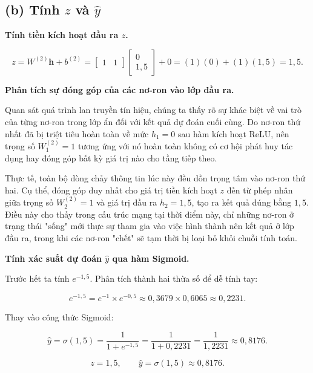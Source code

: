 \documentclass[12pt,a4paper]{article}
\begin{document}
\bigskip
\subsection*{(b) Tính $z$ và $\hat{y}$}

\noindent\textbf{Tính tiền kích hoạt đầu ra $z$.}

\[
  z = W^{(2)}\mathbf{h} + b^{(2)}
    = \begin{bmatrix} 1 & 1 \end{bmatrix}
      \begin{bmatrix} 0 \\ 1{,}5 \end{bmatrix}
    + 0
    = (1)(0) + (1)(1{,}5)
    = 1{,}5.
\]

\textbf{Phân tích sự đóng góp của các nơ-ron vào lớp đầu ra.}

Quan sát quá trình lan truyền tín hiệu, chúng ta thấy rõ sự khác biệt về vai trò của từng nơ-ron trong lớp ẩn đối với kết quả dự đoán cuối cùng. Do nơ-ron thứ nhất đã bị triệt tiêu hoàn toàn về mức $h_1 = 0$ sau hàm kích hoạt ReLU, nên trọng số $W^{(2)}_1 = 1$ tương ứng với nó hoàn toàn không có cơ hội phát huy tác dụng hay đóng góp bất kỳ giá trị nào cho tầng tiếp theo. 

Thực tế, toàn bộ dòng chảy thông tin lúc này đều dồn trọng tâm vào nơ-ron thứ hai. Cụ thể, đóng góp duy nhất cho giá trị tiền kích hoạt $z$ đến từ phép nhân giữa trọng số $W^{(2)}_2 = 1$ và giá trị đầu ra $h_2 = 1,5$, tạo ra kết quả đúng bằng $1,5$. Điều này cho thấy trong cấu trúc mạng tại thời điểm này, chỉ những nơ-ron ở trạng thái "sống" mới thực sự tham gia vào việc hình thành nên kết quả ở lớp đầu ra, trong khi các nơ-ron "chết" sẽ tạm thời bị loại bỏ khỏi chuỗi tính toán.

\medskip
\noindent\textbf{Tính xác suất dự đoán $\hat{y}$ qua hàm Sigmoid.}

Trước hết ta tính $e^{-1{,}5}$. Phân tích thành hai thừa số để dễ tính tay:

\[
  e^{-1{,}5} = e^{-1} \times e^{-0{,}5}
             \approx 0{,}3679 \times 0{,}6065
             \approx 0{,}2231.
\]

Thay vào công thức Sigmoid:

\[
  \hat{y} = \sigma(1{,}5)
           = \frac{1}{1 + e^{-1{,}5}}
           = \frac{1}{1 + 0{,}2231}
           = \frac{1}{1{,}2231}
           \approx 0{,}8176.
\]

\begin{ketqua}
\[
  z = 1{,}5, \qquad \hat{y} = \sigma(1{,}5) \approx \boxed{0{,}8176}.
\]
\end{ketqua}
\end{document}
